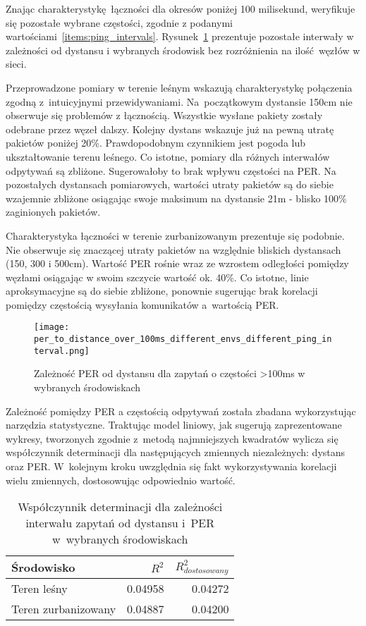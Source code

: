 Znając charakterystykę łączności dla okresów poniżej 100 milisekund, weryfikuje się pozostałe wybrane częstości, zgodnie
z podanymi wartościami~\ref{items:ping_intervals}. Rysunek~\ref{rys:per_to_distance_over_100ms_different_envs_different_ping_interval}
prezentuje pozostałe interwały w zależności od dystansu i wybranych środowisk bez rozróżnienia na ilość węzłów w sieci.

Przeprowadzone pomiary w terenie leśnym wskazują charakterystykę połączenia zgodną z~intuicyjnymi przewidywaniami.
Na~początkowym dystansie 150cm nie obserwuje się problemów z łącznością. Wszystkie wysłane pakiety zostały
odebrane przez węzeł dalszy. Kolejny dystans wskazuje już na pewną utratę pakietów poniżej 20\%. Prawdopodobnym czynnikiem
jest pogoda lub ukształtowanie terenu leśnego. Co istotne, pomiary dla różnych interwałów odpytywań są zbliżone.
Sugerowałoby to brak wpływu częstości na \gls{PER}. Na pozostałych dystansach pomiarowych, wartości utraty pakietów
są do siebie wzajemnie zbliżone osiągając swoje maksimum na dystansie 21m - blisko 100\% zaginionych pakietów.

Charakterystyka łączności w terenie zurbanizowanym prezentuje się podobnie. Nie obserwuje się znaczącej utraty 
pakietów na względnie bliskich dystansach (150, 300 i 500cm). Wartość PER rośnie wraz ze wzrostem odległości
pomiędzy węzłami osiągając w swoim szczycie wartość ok. 40\%. Co istotne, linie aproksymacyjne są do siebie
zbliżone, ponownie sugerując brak korelacji pomiędzy częstością wysyłania komunikatów a~wartością PER.


\begin{figure}[!htb]
	\centering \texttt{[image: per\_to\_distance\_over\_100ms\_different\_envs\_different\_ping\_interval.png]} 
	\caption{Zależność \gls{PER} od dystansu dla zapytań o częstości >100ms w wybranych środowiskach}
	\label{rys:per_to_distance_over_100ms_different_envs_different_ping_interval}
\end{figure}

Zależność pomiędzy PER a częstością odpytywań została zbadana wykorzystując narzędzia statystyczne. Traktując model
liniowy, jak sugerują zaprezentowane wykresy, tworzonych zgodnie z~metodą najmniejszych kwadratów wylicza się 
współczynnik determinacji dla następujących zmiennych niezależnych: dystans oraz PER. W~kolejnym kroku uwzględnia
się fakt wykorzystywania korelacji wielu zmiennych, dostosowując odpowiednio wartość.


\begin{table}[!ht]
\centering
	\begin{tabular}{p{4.5cm}|r|r}
	Środowisko              & $R^2$             & $R^2_{dostosowany}$\\\hline
	Teren leśny             & 0.04958           & 0.04272\\\hline
	Teren zurbanizowany     & 0.04887           & 0.04200\\\hline
	\end{tabular}
\caption{\label{tab:corr_between_ping_intervals}Współczynnik determinacji dla zależności interwału zapytań od dystansu i~PER w~wybranych środowiskach}
\end{table}

